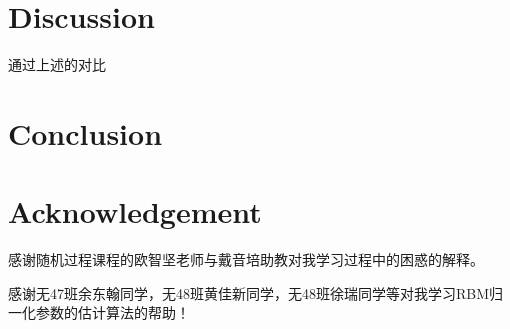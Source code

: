 \documentclass[journal,a4paper]{IEEEtran}
\begin{document}
	\section{Discussion}
		通过上述的对比
		
	\section{Conclusion}
		
		
	\section{Acknowledgement}
	感谢随机过程课程的欧智坚老师与戴音培助教对我学习过程中的困惑的解释。

	感谢无47班余东翰同学，无48班黄佳新同学，无48班徐瑞同学等对我学习RBM归一化参数的估计算法的帮助！

	
\end{document}
